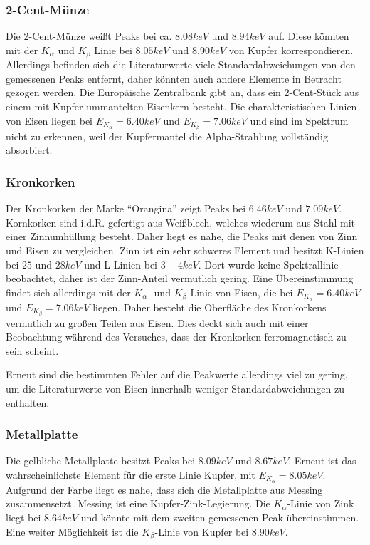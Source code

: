 \documentclass{../Misc/MontavonLaTeX/Montavon}
\begin{document}
\subsubsection{2-Cent-Münze}
Die 2-Cent-Münze weißt Peaks bei ca. $8.08 \unit{keV}$ und $8.94 \unit{keV}$ auf. Diese könnten mit der $K_\alpha$ und $K_\beta$ Linie bei $8.05 \unit{keV}$ und $8.90 \unit{keV}$ von Kupfer\cite{atomdaten} korrespondieren. Allerdings befinden sich die Literaturwerte viele Standardabweichungen von den gemessenen Peaks entfernt, daher könnten auch andere Elemente in Betracht gezogen werden. Die Europäische Zentralbank gibt an, dass ein 2-Cent-Stück aus einem mit Kupfer ummantelten Eisenkern besteht\cite{muenzen}. Die charakteristischen Linien von Eisen liegen bei 	$E_{K_\alpha} = 6.40 \unit{keV}$ und $E_{K_\beta} = 7.06 \unit{keV}$\cite{nist} und sind im Spektrum nicht zu erkennen, weil der Kupfermantel die Alpha-Strahlung vollständig absorbiert.

\subsubsection{Kronkorken}
Der Kronkorken der Marke \enquote{Orangina} zeigt Peaks bei $6.46 \unit{keV}$ und $7.09 \unit{keV}$. Kornkorken sind i.d.R. gefertigt aus Weißblech, welches wiederum aus Stahl mit einer Zinnumhüllung besteht.
Daher liegt es nahe, die Peaks mit denen von Zinn und Eisen zu vergleichen. Zinn ist ein sehr schweres Element und besitzt K-Linien bei $25$ und $28 \unit{keV}$ und L-Linien bei $3-4 \unit{keV}$\cite{nist}. Dort wurde keine Spektrallinie beobachtet, daher ist der Zinn-Anteil vermutlich gering.
Eine Übereinstimmung findet sich allerdings mit der $K_\alpha$- und $K_\beta$-Linie von Eisen, die bei $E_{K_\alpha} = 6.40 \unit{keV}$ und $E_{K_\beta} = 7.06 \unit{keV}$ liegen. Daher besteht die Oberfläche des Kronkorkens vermutlich zu großen Teilen aus Eisen.
Dies deckt sich auch mit einer Beobachtung während des Versuches, dass der Kronkorken ferromagnetisch zu sein scheint.

Erneut sind die bestimmten Fehler auf die Peakwerte allerdings viel zu gering, um die Literaturwerte von Eisen innerhalb weniger Standardabweichungen zu enthalten.

\subsubsection{Metallplatte}
Die gelbliche Metallplatte besitzt Peaks bei $8.09 \unit{keV}$ und $8.67 \unit{keV}$. 
Erneut ist das wahrscheinlichste Element für die erste Linie Kupfer, mit $E_{K_\alpha} = 8.05 \unit{keV}$. 
Aufgrund der Farbe liegt es nahe, dass sich die Metallplatte aus Messing zusammensetzt. Messing ist eine Kupfer-Zink-Legierung. Die $K_\alpha$-Linie von Zink liegt bei $8.64 \unit{keV}$ und könnte mit dem zweiten gemessenen Peak übereinstimmen. Eine weiter Möglichkeit ist die $K_\beta$-Linie von Kupfer bei $8.90 \unit{keV}$.
\end{document}
